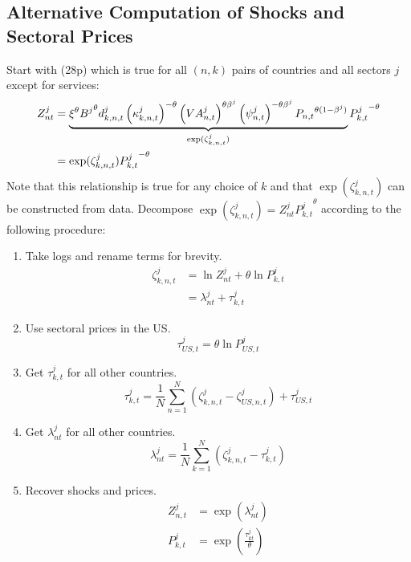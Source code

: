 \documentclass[11pt,oneside,a4paper]{article}
\begin{document}
\subsection{Alternative Computation of Shocks and Sectoral Prices}
Start with (28p) which is true for all $(n, k)$ pairs of countries and all sectors $j$ except for services:
\begin{align}
Z_{nt}^j &= \underbrace{\xi^\theta {B^j}^\theta d_{k, n, t}^j \left(\kappa_{k, n, t}^j\right)^{-\theta} \left(VA_{n, t}^j\right)^{\theta \beta^j} \left(\psi_{n, t}^j\right)^{-\theta \beta^j} {P_{n, t}}^{\theta (1 - \beta^j)}}_{\exp(\zeta_{k, n, t}^j)} {P_{k, t}^j}^{-\theta} \notag \\
&= \exp(\zeta_{k, n, t}^j) {P_{k, t}^j}^{-\theta}
\end{align}
Note that this relationship is true for any choice of $k$ and that $\exp(\zeta_{k, n, t}^j)$ can be constructed from data.
Decompose $\exp(\zeta_{k, n, t}^j) = Z_{nt}^j {P_{k, t}^j}^{\theta}$ according to the following procedure:
\begin{enumerate}
  \item Take logs and rename terms for brevity.
  \begin{align}
  \zeta_{k, n, t}^j &= \ln{Z_{nt}^j} + \theta\ln{P_{k, t}^j} \\
  &= \lambda_{nt}^j + \tau_{k, t}^j
  \end{align}
  \item Use sectoral prices in the US.
  \begin{equation}
  \tau_{US, t}^j = \theta\ln{P_{US, t}^j}
  \end{equation}
  \item Get $\tau_{k, t}^j$ for all other countries.
  \begin{equation}
  \tau_{k, t}^j = \frac{1}{N} \sum_{n = 1}^N \left(\zeta_{k, n, t}^j- \zeta_{US, n, t}^j\right) + \tau_{US, t}^j
  \end{equation}
  \item Get $\lambda_{nt}^j$ for all other countries.
  \begin{equation}
  \lambda_{nt}^j = \frac{1}{N} \sum_{k = 1}^N \left(\zeta_{k, n, t}^j - \tau_{k, t}^j\right)
  \end{equation}
  \item Recover shocks and prices.
  \begin{align}
  Z_{n, t}^j &= \exp\left(\lambda_{nt}^j\right)\\
  P_{k, t}^j &= \exp\left(\frac{\tau_{kt}^j}{\theta}\right)
  \end{align}
\end{enumerate}
\end{document}
